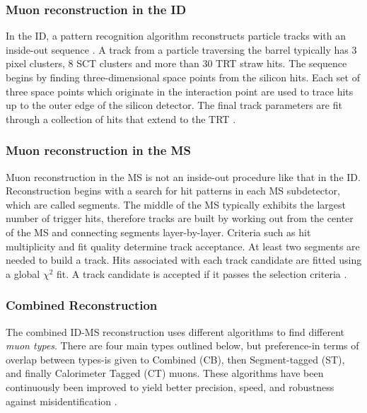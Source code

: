 \subsubsection{Muon reconstruction in the ID}
In the ID, a pattern recognition algorithm reconstructs particle tracks with an inside-out sequence \cite{patternrecognition}. A track from a particle traversing the barrel typically has 3 pixel clusters, 8 SCT clusters and more than 30 TRT straw hits. The sequence begins by finding three-dimensional space points from the silicon hits. Each set of three space points which originate in the  interaction point are used to trace hits up to the outer edge of the silicon detector. The final track parameters are fit through a collection of hits that extend to the TRT \cite{IDreconstruction}.

\subsubsection{Muon reconstruction in the MS}
Muon reconstruction in the MS is not an inside-out procedure like that in the ID. Reconstruction begins with a search for hit patterns in each MS subdetector, which are called segments. The middle of the MS typically exhibits the largest number of trigger hits, therefore tracks are built by working out from the center of the MS and connecting segments layer-by-layer. Criteria such as hit multiplicity and fit quality determine track acceptance. At least two segments are needed to build a track. Hits associated with each track candidate are fitted using a global $\chi^2$ fit. A track candidate is accepted if it passes the selection criteria \cite{ICreconstruction}. 

\subsubsection{Combined Reconstruction}
The combined ID-MS reconstruction uses different algorithms to find different \textit{muon types}. There are four main types outlined below, but preference-in terms of overlap between types-is given to Combined (CB), then Segment-tagged (ST), and finally Calorimeter Tagged (CT) muons. These algorithms have been continuously been improved to yield better precision, speed, and robustness against misidentification \cite{MCPpaper}.  

